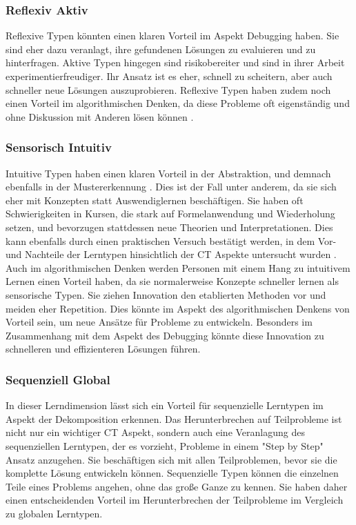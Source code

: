 \subsubsection{Reflexiv Aktiv}
Reflexive Typen könnten einen klaren Vorteil im Aspekt Debugging haben. Sie sind eher dazu veranlagt, ihre gefundenen Lösungen zu evaluieren und zu hinterfragen. Aktive Typen hingegen sind risikobereiter und sind in ihrer Arbeit experimentierfreudiger. Ihr Ansatz ist es eher, schnell zu scheitern, aber auch schneller neue Lösungen auszuprobieren.
Reflexive Typen haben zudem noch einen Vorteil im algorithmischen Denken, da diese Probleme oft eigenständig und ohne Diskussion mit Anderen lösen können \cite{chen}.

\subsubsection{Sensorisch Intuitiv}
Intuitive Typen haben einen klaren Vorteil in der Abstraktion, und demnach ebenfalls in der Mustererkennung \cite{felderhandout}. Dies ist der Fall unter anderem, da sie sich eher mit Konzepten statt Auswendiglernen beschäftigen. Sie haben oft Schwierigkeiten in Kursen, die stark auf Formelanwendung und Wiederholung setzen, und bevorzugen stattdessen neue Theorien und Interpretationen. Dies kann ebenfalls durch einen praktischen Versuch bestätigt werden, in dem Vor- und Nachteile der Lerntypen hinsichtlich der CT Aspekte untersucht wurden \cite{chen}.
Auch im algorithmischen Denken werden Personen mit einem Hang zu intuitivem Lernen einen Vorteil haben, da sie normalerweise Konzepte schneller lernen als sensorische Typen. Sie ziehen Innovation den etablierten Methoden vor und meiden eher Repetition. Dies könnte im Aspekt des algorithmischen Denkens von Vorteil sein, um neue Ansätze für Probleme zu entwickeln. Besonders im Zusammenhang mit dem Aspekt des Debugging könnte diese Innovation zu schnelleren und effizienteren Lösungen führen.

\subsubsection{Sequenziell Global}
In dieser Lerndimension lässt sich ein Vorteil für sequenzielle Lerntypen im Aspekt der Dekomposition erkennen. Das Herunterbrechen auf Teilprobleme ist nicht nur ein wichtiger CT Aspekt, sondern auch eine Veranlagung des sequenziellen Lerntypen, der es vorzieht, Probleme in einem "Step by Step" Ansatz anzugehen. Sie beschäftigen sich mit allen Teilproblemen, bevor sie die komplette Lösung entwickeln können. Sequenzielle Typen können die einzelnen Teile eines Problems angehen, ohne das große Ganze zu kennen. Sie haben daher einen entscheidenden Vorteil im Herunterbrechen der Teilprobleme im Vergleich zu globalen Lerntypen.

